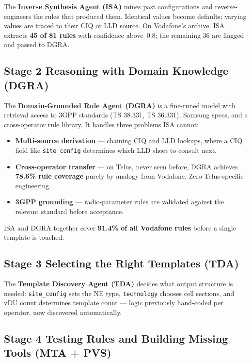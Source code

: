 \documentclass[10.5pt]{article}
\begin{document}
The \textbf{Inverse Synthesis Agent (ISA)} mines past configurations and reverse-engineers the rules that produced them. Identical values become defaults; varying values are traced to their CIQ or LLD source. On Vodafone's archive, ISA extracts \textbf{45 of 81 rules} with confidence above~0.8; the remaining 36 are flagged and passed to DGRA.

\subsection*{Stage 2 \quad Reasoning with Domain Knowledge (DGRA)}

The \textbf{Domain-Grounded Rule Agent (DGRA)} is a fine-tuned model with retrieval access to 3GPP standards (TS 38.331, TS 36.331), Samsung specs, and a cross-operator rule library. It handles three problems ISA cannot:

\begin{itemize}[leftmargin=1.4em, itemsep=3pt, topsep=3pt]
  \item \textbf{Multi-source derivation} --- chaining CIQ and LLD lookups, where a CIQ field like \texttt{site\_config} determines which LLD sheet to consult next.
  \item \textbf{Cross-operator transfer} --- on Telus, never seen before, DGRA achieves \textbf{78.6\% rule coverage} purely by analogy from Vodafone. Zero Telus-specific engineering.
  \item \textbf{3GPP grounding} --- radio-parameter rules are validated against the relevant standard before acceptance.
\end{itemize}

ISA and DGRA together cover \textbf{91.4\% of all Vodafone rules} before a single template is touched.

\subsection*{Stage 3 \quad Selecting the Right Templates (TDA)}

The \textbf{Template Discovery Agent (TDA)} decides what output structure is needed: \texttt{site\_config} sets the NE type, \texttt{technology} chooses cell sections, and vDU count determines template count --- logic previously hand-coded per operator, now discovered automatically.

\subsection*{Stage 4 \quad Testing Rules and Building Missing Tools (MTA + PVS)}
\end{document}
